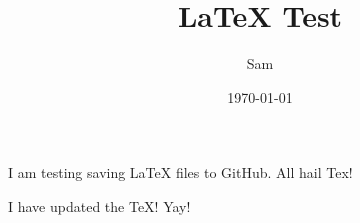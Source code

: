 \documentclass[12pt]{article}
\begin{document}
\title{LaTeX Test}
\author{Sam}
\date{\today}
\maketitle


I am testing saving LaTeX files to GitHub. All hail Tex!

I have updated the TeX! Yay!
\end{document}
